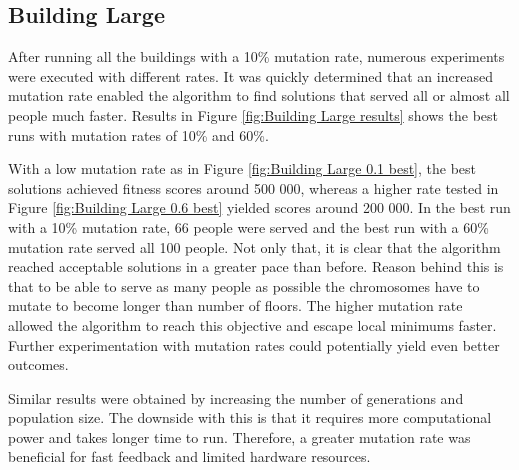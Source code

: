 \newpage

\subsection{Building Large}
After running all the buildings with a 10\% mutation rate, numerous experiments were executed with different rates. It was quickly determined that an increased mutation rate enabled the algorithm to find solutions that served all or almost all people much faster. Results in Figure \ref{fig:Building Large results} shows the best runs with mutation rates of 10\% and 60\%.

With a low mutation rate as in Figure \ref{fig:Building Large 0.1 best}, the best solutions achieved fitness scores around 500 000, whereas a higher rate tested in Figure \ref{fig:Building Large 0.6 best} yielded scores around 200 000. In the best run with a 10\% mutation rate, 66 people were served and the best run with a 60\% mutation rate served all 100 people. Not only that, it is clear that the algorithm reached acceptable solutions in a greater pace than before. Reason behind this is that to be able to serve as many people as possible the chromosomes have to mutate to become longer than number of floors. The higher mutation rate allowed the algorithm to reach this objective and escape local minimums faster. Further experimentation with mutation rates could potentially yield even better outcomes.

Similar results were obtained by increasing the number of generations and population size. The downside with this is that it requires more computational power and takes longer time to run. Therefore, a greater mutation rate was beneficial for fast feedback and limited hardware resources.

